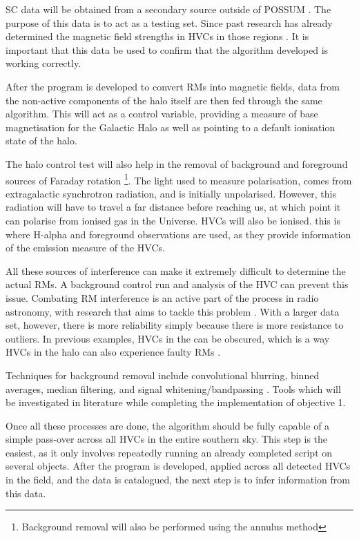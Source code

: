 SC data will be obtained from a secondary source outside of POSSUM \cite{ID18, ID26, ID28}. The purpose of this data is to act as a testing set. Since past research has already determined the magnetic field strengths in HVCs in those regions \cite{ID26}. It is important that this data be used to confirm that the algorithm developed is working correctly.

After the program is developed to convert RMs into magnetic fields, data from the non-active components of the halo itself are then fed through the same algorithm. This will act as a control variable, providing a measure of base magnetisation for the Galactic Halo as well as pointing to a default ionisation state of the halo.

The halo control test will also help in the removal of background and foreground sources of Faraday rotation \footnote{Background removal will also be performed using the annulus method}. The light used to measure polarisation, comes from extragalactic synchrotron radiation, and is initially unpolarised. However, this radiation will have to travel a far distance before reaching us, at which point it can polarise from ionised gas in the Universe. HVCs will also be ionised. this is where H-alpha and foreground observations are used, as they provide information of the emission measure of the HVCs.

All these sources of interference can make it extremely difficult to determine the actual RMs. A background control run and analysis of the HVC can prevent this issue. Combating RM interference is an active part of the process in radio astronomy, with research that aims to tackle this problem \cite{ID21}. With a larger data set, however, there is more reliability simply because there is more resistance to outliers. In previous examples, HVCs in the can be obscured, which is a way HVCs in the halo can also experience faulty RMs \cite{ID2, ID36}.

Techniques for background removal include convolutional blurring, binned averages, median filtering, and signal whitening/bandpassing \cite{ID38, ID39, ID40}. Tools which will be investigated in literature while completing the implementation of objective 1.

Once all these processes are done, the algorithm should be fully capable of a simple pass-over across all HVCs in the entire southern sky. This step is the easiest, as it only involves repeatedly running an already completed script on several objects. After the program is developed, applied across all detected HVCs in the field, and the data is catalogued, the next step is to infer information from this data.


